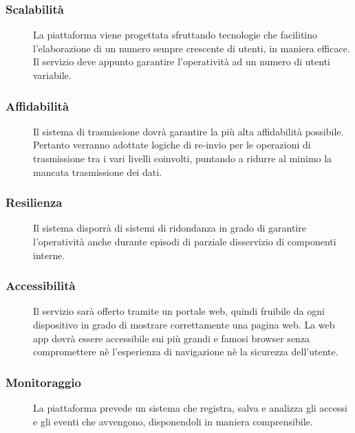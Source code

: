 \documentclass{article}
\begin{document}
\subsubsection{Scalabilità} \label{rnf_3}
\begin{description}
    \item[] La piattaforma viene progettata sfruttando tecnologie che facilitino l'elaborazione di un numero sempre crescente di utenti, in maniera efficace. Il servizio deve appunto garantire l'operatività ad un numero di utenti variabile.
\end{description}


\subsubsection{Affidabilità} \label{rnf_4}
\begin{description}
    \item[] Il sistema di trasmissione dovrà garantire la più alta affidabilità possibile. Pertanto verranno adottate
logiche di re-invio per le operazioni di trasmissione tra i vari livelli coinvolti, puntando a ridurre al minimo la mancata trasmissione dei dati.
\end{description}

\subsubsection{Resilienza} \label{rnf_5}
\begin{description}
    \item[] Il sistema disporrà di sistemi di ridondanza in grado di garantire l'operatività anche durante episodi di parziale disservizio di componenti interne.
\end{description}

\subsubsection{Accessibilità} \label{rnf_6}
\begin{description}
    \item[] Il servizio sarà offerto tramite un portale web, quindi fruibile da ogni dispositivo in grado di mostrare correttamente una pagina web. La web app dovrà essere accessibile sui più grandi e famosi browser senza compromettere nè l’esperienza di navigazione nè la sicurezza dell'utente.
\end{description}

\subsubsection{Monitoraggio} \label{rnf_7}
\begin{description}
    \item[] La piattaforma prevede un sistema che registra, salva e analizza gli accessi e gli eventi che avvengono, disponendoli in maniera comprensibile.
\end{description}
\end{document}
